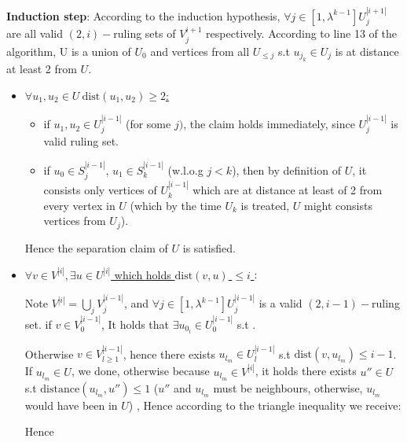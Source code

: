 \documentclass[11pt]{article}
\begin{document}
\textbf{Induction step}: According to the induction hypothesis, $\forall j\in[1, \lambda^{k-1}] U^{|i+1|}_{j}$ are all valid $(2, i)-$ruling sets of $V^{i+1}_{j}$ respectively. According to line 13 of the algorithm, U is a union of $U_0$ and vertices from all $U_{ \le j}$ s.t $u_{j_k} \in U_j$ is at distance at least 2 from $U$.
\begin{itemize}
    \item \underline{$\forall u_1, u_2 \in U \: \text{dist}(u_1,u_2) \ge 2$:}
        \begin{itemize}
            \item if $u_1, u_2 \in U^{|i-1|}_{j}$ (for some $j) $, the claim holds immediately, since $U^{|i-1|}_{j}$ is valid ruling set.
            \item if $u_0 \in S^{|i-1|}_{j}$, $u_1 \in S^{|i-1|}_{k}$ (w.l.o.g $j < k$), then by definition of $U$, it consists only vertices of $U^{|i-1|}_{k}$ which are at distance at least of 2 from every vertex in $U$ (which by the time $U_k$ is treated, $U$ might consists vertices from $U_j$).
        \end{itemize}
    Hence the separation claim of $U$ is satisfied.
    
    \item \underline{$\forall v\in V^{|i|}, \exists u \in U^{|i|}$ which holds $\text{dist}(v,u)$ $\le i$ }:
    
    Note $V^{|i|}= \bigcup_{j} V^{|i-1|}_{j}$, and $\forall j\in[1, \lambda^{k-1}] U^{|i-1|}_j$ is a valid $(2,i-1)-$ruling set.
    if $v \in V^{|i-1|}_0$, It holds that $\exists u_{0_l} \in U^{|i-1|}_0$
    s.t .
    
    Otherwise $v \in  V^{|i-1|}_{l \ge 1}$, hence there exists $u_{l_m} \in U^{|i-1|}_l$ s.t $\text{dist}(v, u_{l_m}) \le i-1$.
    If $u_{l_m} \in U$, we done, otherwise because $u_{l_m} \in V^{|i|}$, it holds there exists $u''\in U$ s.t $\text{distance}(u_{l_m}, u'') \le 1$ ($u''$ and $u_{l_m}$ must be neighbours, otherwise, $u_{l_m}$ would have been in $U$) , Hence according to the triangle inequality we receive: 
    
    
    Hence 
    
\end{itemize}
\end{document}
